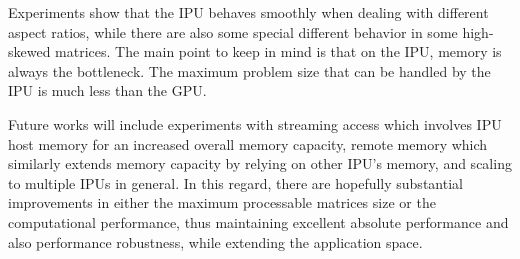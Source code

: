 \documentclass[a4paper,UKenglish,cleveref, autoref, thm-restate]{oasics-v2021}
\begin{document}
Experiments show that the IPU behaves smoothly when dealing with different aspect ratios, while there are also some special different behavior in some high-skewed matrices. The main point to keep in mind is that on the IPU, memory is always the bottleneck. The maximum problem size that can be handled by the IPU is much less than the GPU.



Future works will include experiments with streaming access which involves IPU host memory for an increased overall memory capacity, remote memory which similarly extends memory capacity by relying on other IPU's memory, and scaling to multiple IPUs in general. In this regard, there are hopefully substantial improvements in either the maximum processable matrices size or the computational performance, thus maintaining excellent absolute performance and also performance robustness, while extending the application space.





\end{document}
